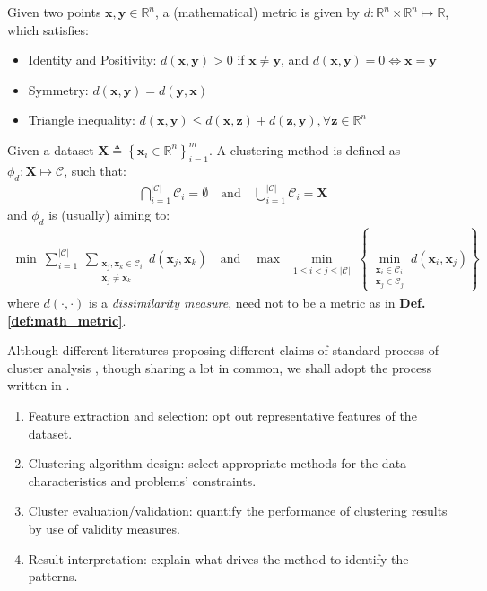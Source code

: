 \begin{definition}
    \label{def:math_metric}
    Given two points $\mathbf x, \mathbf y \in \mathbb R^n$, a (mathematical) metric is given by
    $d: \mathbb R^n \times \mathbb R^n \mapsto \mathbb R$, which satisfies:
    \begin{itemize}
        \item Identity and Positivity: $d(\mathbf x, \mathbf y) > 0$ if $\mathbf x \neq \mathbf y$, and $d(\mathbf x, \mathbf y) = 0 \Leftrightarrow \mathbf x = \mathbf y$
        \item Symmetry: $d(\mathbf x, \mathbf y) = d(\mathbf y, \mathbf x)$
        \item Triangle inequality: $d(\mathbf x, \mathbf y) \le d(\mathbf x, \mathbf z) + d(\mathbf z, \mathbf y), \forall \mathbf z \in \mathbb R^n$
    \end{itemize}
\end{definition}

\begin{definition}
    \label{def:cluster_method}
    Given a dataset $\mathbf X \triangleq \left\{\mathbf x_i \in \mathbb R^n\right\}_{i = 1}^m$.
    A clustering method is defined as $\phi_d: \mathbf X \mapsto \mathcal C$, such that:
    \begin{align}
        \bigcap_{i = 1}^{|\mathcal C|} \mathcal C_i = \emptyset
        \quad \text{and} \quad
        \bigcup_{i = 1}^{|\mathcal C|} \mathcal C_i = \mathbf X
    \end{align}
    and $\phi_d$ is (usually) aiming to:
    \begin{align}
        \min ~\sum_{i = 1}^{|\mathcal C|} ~\sum_{\substack{\mathbf x_j, \mathbf x_k \in \mathcal C_i \\ \mathbf x_j \neq \mathbf x_k}} d(\mathbf x_j, \mathbf x_k)
        \quad \text{and} \quad
        \max ~ \min_{\substack{1 \le i < j \le |\mathcal C|}} \left\{ \min_{\substack{ \mathbf x_i \in \mathcal C_i \\ \mathbf x_j \in \mathcal C_j}} d(\mathbf x_i, \mathbf x_j) \right\}
    \end{align}
    where $d(\cdot, \cdot)$ is a \textit{dissimilarity measure}, need not to be a metric as in \textbf{Def. \ref{def:math_metric}}.
\end{definition}

Although different literatures proposing different claims of standard process of cluster analysis \cite{ref_6}, though sharing a lot in common, we shall adopt the process written in \cite{ref_5}.
\begin{enumerate}
    \item Feature extraction and selection: opt out representative features of the dataset.
    \item Clustering algorithm design: select appropriate methods for the data characteristics and problems' constraints.
    \item Cluster evaluation/validation: quantify the performance of clustering results by use of validity measures.
    \item Result interpretation: explain what drives the method to identify the patterns.
\end{enumerate}

